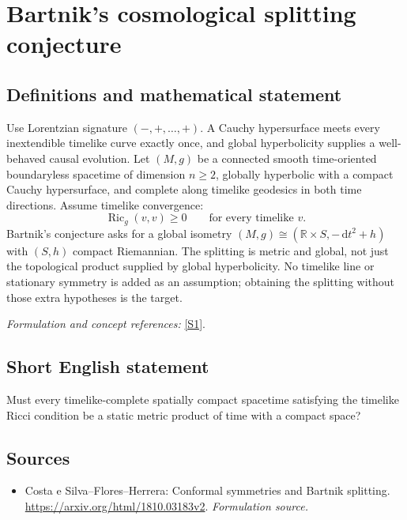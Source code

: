 \documentclass[11pt]{article}
\begin{document}
\section*{\texorpdfstring{Bartnik's cosmological splitting conjecture}{Bartnik's cosmological splitting conjecture}}\label{398}
\subsection{Definitions and mathematical statement}
Use Lorentzian signature $(-,+,\ldots,+)$. A Cauchy hypersurface meets every inextendible timelike curve exactly once, and global hyperbolicity supplies a well-behaved causal evolution. Let $(M,g)$ be a connected smooth time-oriented boundaryless spacetime of dimension $n\ge2$, globally hyperbolic with a compact Cauchy hypersurface, and complete along timelike geodesics in both time directions. Assume timelike convergence:
\[
 \operatorname{Ric}_g(v,v)\ge0\qquad\text{for every timelike }v.
\]
Bartnik's conjecture asks for a global isometry $(M,g)\cong({\mathbb{R}}\times S,-{\,\mathrm{d}} t^2+h)$ with $(S,h)$ compact Riemannian. The splitting is metric and global, not just the topological product supplied by global hyperbolicity. No timelike line or stationary symmetry is added as an assumption; obtaining the splitting without those extra hypotheses is the target.
\par\smallskip\textit{Formulation and concept references:} \href{https://arxiv.org/html/1810.03183v2}{[S1]}.

\subsection{Short English statement}
Must every timelike-complete spatially compact spacetime satisfying the timelike Ricci condition be a static metric product of time with a compact space?
\subsection{Sources}
\begin{itemize}
\item[S1]Costa e Silva–Flores–Herrera: Conformal symmetries and Bartnik splitting.
\url{https://arxiv.org/html/1810.03183v2}.
\textit{Formulation source.}
\end{itemize}
\end{document}
